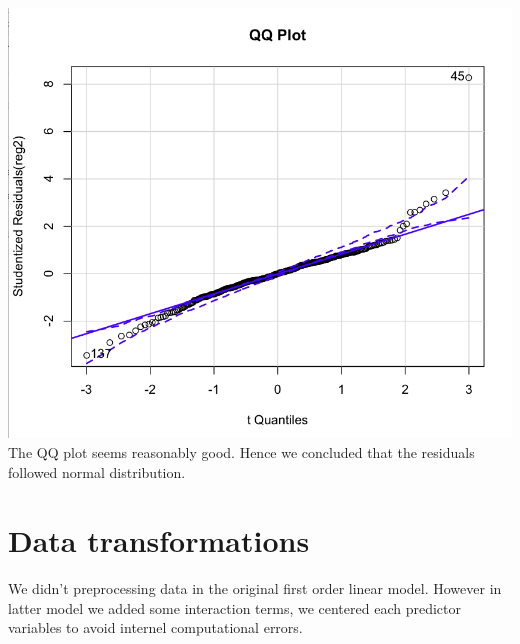 \documentclass{article}
\begin{document}
\includegraphics[scale = 0.5]{qq.png}\\
The QQ plot seems reasonably good. Hence we concluded that the residuals followed normal distribution.

\section*{Data transformations}
We didn't preprocessing data in the original first order linear model. However in latter model we added some interaction terms, we centered each predictor variables to avoid internel computational errors.
\end{document}

